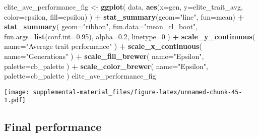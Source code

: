 \documentclass[]{book}
\newenvironment{Shaded}{\begin{snugshade}}{\end{snugshade}}
\newcommand{\DataTypeTok}[1]{\textcolor[rgb]{0.13,0.29,0.53}{#1}}
\newcommand{\DecValTok}[1]{\textcolor[rgb]{0.00,0.00,0.81}{#1}}
\newcommand{\FloatTok}[1]{\textcolor[rgb]{0.00,0.00,0.81}{#1}}
\newcommand{\KeywordTok}[1]{\textcolor[rgb]{0.13,0.29,0.53}{\textbf{#1}}}
\newcommand{\NormalTok}[1]{#1}
\newcommand{\OperatorTok}[1]{\textcolor[rgb]{0.81,0.36,0.00}{\textbf{#1}}}
\newcommand{\StringTok}[1]{\textcolor[rgb]{0.31,0.60,0.02}{#1}}
\begin{document}
\begin{Shaded}
\begin{Highlighting}[]
\NormalTok{elite_ave_performance_fig <-}
\StringTok{  }\KeywordTok{ggplot}\NormalTok{(}
\NormalTok{    data,}
    \KeywordTok{aes}\NormalTok{(}\DataTypeTok{x=}\NormalTok{gen, }\DataTypeTok{y=}\NormalTok{elite_trait_avg, }\DataTypeTok{color=}\NormalTok{epsilon, }\DataTypeTok{fill=}\NormalTok{epsilon)}
\NormalTok{  ) }\OperatorTok{+}
\StringTok{  }\KeywordTok{stat_summary}\NormalTok{(}\DataTypeTok{geom=}\StringTok{"line"}\NormalTok{, }\DataTypeTok{fun=}\NormalTok{mean) }\OperatorTok{+}
\StringTok{  }\KeywordTok{stat_summary}\NormalTok{(}
    \DataTypeTok{geom=}\StringTok{"ribbon"}\NormalTok{,}
    \DataTypeTok{fun.data=}\StringTok{"mean_cl_boot"}\NormalTok{,}
    \DataTypeTok{fun.args=}\KeywordTok{list}\NormalTok{(}\DataTypeTok{conf.int=}\FloatTok{0.95}\NormalTok{),}
    \DataTypeTok{alpha=}\FloatTok{0.2}\NormalTok{,}
    \DataTypeTok{linetype=}\DecValTok{0}
\NormalTok{  ) }\OperatorTok{+}
\StringTok{  }\KeywordTok{scale_y_continuous}\NormalTok{(}
    \DataTypeTok{name=}\StringTok{"Average trait performance"}
\NormalTok{  ) }\OperatorTok{+}
\StringTok{  }\KeywordTok{scale_x_continuous}\NormalTok{(}
    \DataTypeTok{name=}\StringTok{"Generations"}
\NormalTok{  ) }\OperatorTok{+}
\StringTok{  }\KeywordTok{scale_fill_brewer}\NormalTok{(}
    \DataTypeTok{name=}\StringTok{"Epsilon"}\NormalTok{,}
    \DataTypeTok{palette=}\NormalTok{cb_palette}
\NormalTok{  ) }\OperatorTok{+}
\StringTok{  }\KeywordTok{scale_color_brewer}\NormalTok{(}
    \DataTypeTok{name=}\StringTok{"Epsilon"}\NormalTok{,}
    \DataTypeTok{palette=}\NormalTok{cb_palette}
\NormalTok{  )}
\NormalTok{elite_ave_performance_fig}
\end{Highlighting}
\end{Shaded}

\texttt{[image: supplemental-material\_files/figure-latex/unnamed-chunk-45-1.pdf]}

\hypertarget{final-performance-3}{%
\subsection{Final performance}\label{final-performance-3}}
\end{document}
